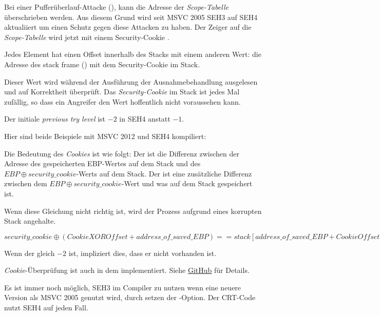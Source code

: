 
\myindex{\BufferOverflow}
Bei einer Pufferüberlauf-Attacke (), kann die Adresse der \emph{Scope-Tabelle}
überschrieben werden. Aus diesem Grund wird seit MSVC 2005 SEH3 auf SEH4 aktualiiert um einen Schutz gegen
diese Attacken zu haben.
Der Zeiger auf die \emph{Scope-Tabelle} wird jetzt mit einem Security-Cookie .

Jedes Element hat einen Offset innerhalb des Stacks mit einem anderen Wert:
die Adresse des \gls{stack frame} (\EBP)  mit dem Security-Cookie im Stack.

Dieser Wert wird während der Ausführung der Ausnahmebehandlung ausgelesen und auf
Korrektheit überprüft.
Das \emph{Security-Cookie} im Stack ist jedes Mal zufällig, so dass ein Angreifer den
Wert hoffentlich nicht voraussehen kann.

Der initiale \emph{previous try level} ist $-2$ in SEH4 anstatt $-1$.

\def\SEHfour{1}


Hier sind beide Beispiele mit MSVC 2012 und SEH4 kompiliert:





Die Bedeutung des \emph{Cookies} ist wie folgt:
Der  ist die Differenz zwischen der Adresse des gespeicherten EBP-Wertes
auf dem Stack und des $EBP \oplus security\_cookie$-Werts auf dem Stack.
Der   ist eine zusätzliche Differenz zwischen dem $EBP \oplus security\_cookie$-Wert
und was auf dem Stack gespeichert ist.

Wenn diese Gleichung nicht richtig ist, wird der Prozess aufgrund eines korrupten Stack angehalte.

\begin{center}
$security\_cookie \oplus (CookieXOROffset + address\_of\_saved\_EBP) == stack[address\_of\_saved\_EBP + CookieOffset]$
\end{center}

Wenn der  gleich $-2$ ist, impliziert dies, dass er nicht vorhanden ist.

\emph{Cookie}-Überprüfung ist auch in dem \tracer{} implementiert.
Siehe \href{http://go.yurichev.com/17061}{GitHub} für Details.

Es ist immer noch möglich, SEH3 im Compiler zu nutzen wenn eine neuere Version als MSVC 2005
genutzt wird, durch setzen der -Option.
Der \ac{CRT}-Code nutzt SEH4 auf jeden Fall.
